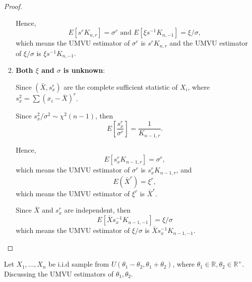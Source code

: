\begin{proof}
\begin{enumerate}
              Hence,
              \begin{equation*}
                  E\left[s^rK_{n,r}\right]=\sigma^r \text{ and } E[\xi s^{-1}K_{n,-1}]=\xi/\sigma,
              \end{equation*}
              which means the UMVU estimator of $\sigma^r$ is $s^rK_{n,r}$ and the UMVU estimator of $\xi/\sigma$ is $\xi s^{-1}K_{n,-1}$.

        \item \textbf{Both $\xi$ and $\sigma$ is unknown}:

              Since $(\bar{X},s_x^r)$ are the complete sufficient statistic of $X_i$, where $s_x^2=\sum\left(x_{i}-\bar{X}\right)^r$.

              Since $s_x^2/\sigma^2\sim\chi^2(n-1)$, then
              \begin{equation*}
                  E\left[\frac{s_x^r}{\sigma^r}\right]=\frac{1}{K_{n-1,r}}.
              \end{equation*}

              Hence,
              \begin{equation*}
                  E\left[s_x^rK_{n-1,r}\right]=\sigma^r,
              \end{equation*}
              which means the UMVU estimator of $\sigma^r$ is $s_x^rK_{n-1,r}$,
              and
              \begin{equation*}
                  E(\bar{X}^r)=\xi^r,
              \end{equation*}
              which means the UMVU estimator of $\xi^r$ is $\bar{X}^r$.

              Since $\bar{X}$ and $s_x^r$ are independent, then
              \begin{equation*}
                  E[\bar{X}s_x^{-1}K_{n-1,-1}]=\xi/\sigma
              \end{equation*}
              which means the UMVU estimator of $\xi/\sigma$ is $\bar{X}s_x^{-1}K_{n-1,-1}$.
    \end{enumerate}
\end{proof}

\begin{example}[]
    Let $X_{1},\ldots,X_{n}$ be i.i.d sample from $U\left(\theta_1-\theta_2,\theta_1+\theta_2\right)$, where $\theta_1\in\mathbb{R},\theta_2\in\mathbb{R}^+$. Discussing the UMVU estimators of $\theta_1,\theta_2$.
\end{example}

